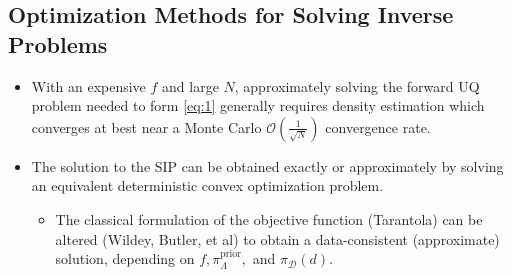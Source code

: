 \documentclass[11pt]{beamer}
\begin{document}
\subsection{Optimization Methods for Solving Inverse Problems}

\begin{frame}

\begin{itemize}

	\item With an expensive $f$ and large $N$, approximately solving the forward UQ problem needed to form \eqref{eq:1} generally requires density estimation which converges at best near a Monte Carlo $\mathcal{O}\left(\frac{1}{\sqrt{N}} \right)$ convergence rate.
	
	\item The solution to the SIP can be obtained exactly or approximately by solving an equivalent deterministic convex optimization problem.
	
	\begin{itemize}
		\item The classical formulation of the objective function (Tarantola) can be altered (Wildey, Butler, et al) to obtain a data-consistent (approximate) solution, depending on $f, \pi_\Lambda^{\text{prior}},$ and $\pi_\mathcal{D}(d)$.
	\end{itemize}

\end{itemize}

\end{frame}
\end{document}
